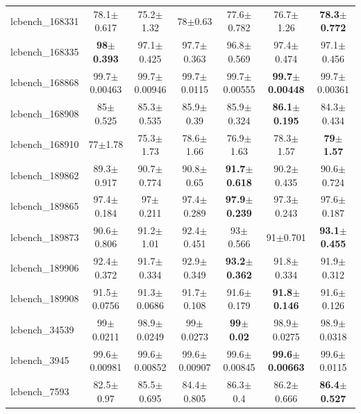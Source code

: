 \begin{table}[t]
\begin{center}
\begin{tabular}{lcccccc}
lcbench\_168331 & 78.1$\pm$0.617 & 75.2$\pm$1.32 & 78$\pm$0.63 & 77.6$\pm$0.782 & 76.7$\pm$1.26 & \textbf{78.3$\pm$0.772} \\
lcbench\_168335 & \textbf{98$\pm$0.393} & 97.1$\pm$0.425 & 97.7$\pm$0.363 & 96.8$\pm$0.569 & 97.4$\pm$0.474 & 97.1$\pm$0.456 \\
lcbench\_168868 & 99.7$\pm$0.00463 & 99.7$\pm$0.00946 & 99.7$\pm$0.0115 & 99.7$\pm$0.00555 & \textbf{99.7$\pm$0.00448} & 99.7$\pm$0.00361 \\
lcbench\_168908 & 85$\pm$0.525 & 85.3$\pm$0.535 & 85.9$\pm$0.39 & 85.9$\pm$0.324 & \textbf{86.1$\pm$0.195} & 84.3$\pm$0.434 \\
lcbench\_168910 & 77$\pm$1.78 & 75.3$\pm$1.73 & 78.6$\pm$1.66 & 76.9$\pm$1.63 & 78.3$\pm$1.57 & \textbf{79$\pm$1.57} \\
lcbench\_189862 & 89.3$\pm$0.917 & 90.7$\pm$0.774 & 90.8$\pm$0.65 & \textbf{91.7$\pm$0.618} & 90.2$\pm$0.435 & 90.6$\pm$0.724 \\
lcbench\_189865 & 97.4$\pm$0.184 & 97$\pm$0.211 & 97.4$\pm$0.289 & \textbf{97.9$\pm$0.239} & 97.3$\pm$0.243 & 97.6$\pm$0.187 \\
lcbench\_189873 & 90.6$\pm$0.806 & 91.2$\pm$1.01 & 92.4$\pm$0.451 & 93$\pm$0.566 & 91$\pm$0.701 & \textbf{93.1$\pm$0.455} \\
lcbench\_189906 & 92.4$\pm$0.372 & 91.7$\pm$0.334 & 92.9$\pm$0.349 & \textbf{93.2$\pm$0.362} & 91.8$\pm$0.334 & 91.9$\pm$0.312 \\
lcbench\_189908 & 91.5$\pm$0.0756 & 91.3$\pm$0.0686 & 91.7$\pm$0.108 & 91.6$\pm$0.179 & \textbf{91.8$\pm$0.146} & 91.6$\pm$0.126 \\
lcbench\_34539 & 99$\pm$0.0211 & 98.9$\pm$0.0249 & 99$\pm$0.0273 & \textbf{99$\pm$0.02} & 98.9$\pm$0.0275 & 98.9$\pm$0.0318 \\
lcbench\_3945 & 99.6$\pm$0.00981 & 99.6$\pm$0.00852 & 99.6$\pm$0.00907 & 99.6$\pm$0.00845 & \textbf{99.6$\pm$0.00663} & 99.6$\pm$0.0115 \\
lcbench\_7593 & 82.5$\pm$0.97 & 85.5$\pm$0.695 & 84.4$\pm$0.805 & 86.3$\pm$0.4 & 86.2$\pm$0.666 & \textbf{86.4$\pm$0.527} \\
\hline
\end{tabular}
\end{center}
\end{table}